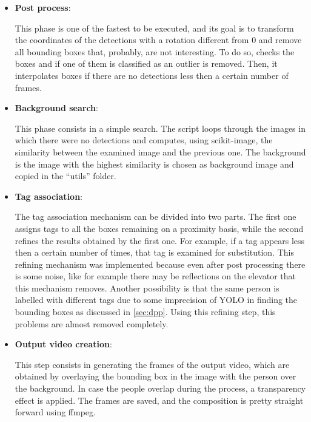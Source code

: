 \documentclass[conference]{IEEEtran}
\begin{document}
\begin{itemize}
			\item \textbf{Post process}:
			
				This phase is one of the fastest to be executed, and its goal is to transform the coordinates of the detections with a rotation different from 
				0 and remove all bounding boxes that, probably, are not interesting. To do so, checks the boxes and if one of them is classified as an outlier 
				is removed. Then, it interpolates boxes if there are no detections less then a certain number of frames.
			
			\item \textbf{Background search}:
			
				This phase consists in a simple search. The script loops through the images in which there were no detections and computes, using scikit-image,
				the similarity between the examined image and the previous one. The background is the image with the highest similarity is chosen as background 
				image and copied in the ``utils'' folder.
			
			\item \textbf{Tag association}:
				
				The tag association mechanism can be divided into two parts. The first one assigns tags to all the boxes remaining on a proximity basis, while 
				the second refines the results obtained by the first one. For example, if a tag appears less then a certain number of times, that tag is 
				examined for substitution. This refining mechanism was implemented because even after post processing there is some noise, like for example there 
				may be reflections on the elevator that this mechanism removes. Another possibility is that the same person is labelled with different tags due to 
				some imprecision of YOLO in finding the bounding boxes as discussed in \ref{sec:dpp}. Using this refining step, this problems are almost removed 
				completely. 
			
			\item \textbf{Output video creation}:
			
				This step consists in generating the frames of the output video, which are obtained by overlaying the bounding box in the image with the person 
				over the background. In case the people overlap during the process, a transparency effect is applied. The frames are saved, and the composition is 
				pretty straight forward using ffmpeg.
			
			
		\end{itemize}
\end{document}
